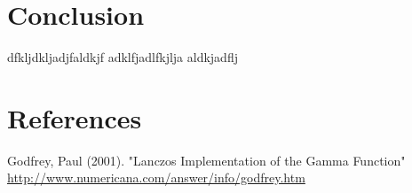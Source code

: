 \documentclass[12pt]{article}
\begin{document}
\section{Conclusion}

dfkljdkljadjfaldkjf
adklfjadlfkjlja
aldkjadflj

\section{References}
\begin{thebibliography}{2}
	 Godfrey, Paul (2001). "Lanczos Implementation of the Gamma Function" \url{http://www.numericana.com/answer/info/godfrey.htm}
\end{thebibliography}
\end{document}
